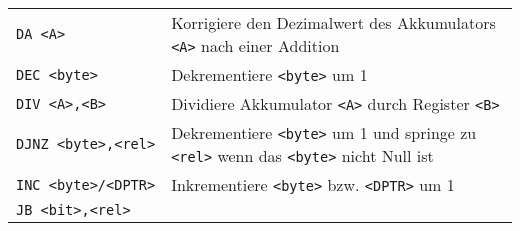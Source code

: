 \begin{longtable}[c]{@{}ll@{}}
\begin{minipage}[t]{0.25\columnwidth}\raggedright\strut
\texttt{DA\ \textless{}A\textgreater{}}
\strut\end{minipage} &
\begin{minipage}[t]{0.69\columnwidth}\raggedright\strut
Korrigiere den Dezimalwert des Akkumulators
\texttt{\textless{}A\textgreater{}} nach einer Addition
\strut\end{minipage}\tabularnewline
\begin{minipage}[t]{0.25\columnwidth}\raggedright\strut
\texttt{DEC\ \textless{}byte\textgreater{}}
\strut\end{minipage} &
\begin{minipage}[t]{0.69\columnwidth}\raggedright\strut
Dekrementiere \texttt{\textless{}byte\textgreater{}} um 1
\strut\end{minipage}\tabularnewline
\begin{minipage}[t]{0.25\columnwidth}\raggedright\strut
\texttt{DIV\ \textless{}A\textgreater{},\textless{}B\textgreater{}}
\strut\end{minipage} &
\begin{minipage}[t]{0.69\columnwidth}\raggedright\strut
Dividiere Akkumulator \texttt{\textless{}A\textgreater{}} durch Register
\texttt{\textless{}B\textgreater{}}
\strut\end{minipage}\tabularnewline
\begin{minipage}[t]{0.25\columnwidth}\raggedright\strut
\texttt{DJNZ\ \textless{}byte\textgreater{},\textless{}rel\textgreater{}}
\strut\end{minipage} &
\begin{minipage}[t]{0.69\columnwidth}\raggedright\strut
Dekrementiere \texttt{\textless{}byte\textgreater{}} um 1 und springe zu
\texttt{\textless{}rel\textgreater{}} wenn das
\texttt{\textless{}byte\textgreater{}} nicht Null ist
\strut\end{minipage}\tabularnewline
\begin{minipage}[t]{0.25\columnwidth}\raggedright\strut
\texttt{INC\ \textless{}byte\textgreater{}/\textless{}DPTR\textgreater{}}
\strut\end{minipage} &
\begin{minipage}[t]{0.69\columnwidth}\raggedright\strut
Inkrementiere \texttt{\textless{}byte\textgreater{}} bzw.
\texttt{\textless{}DPTR\textgreater{}} um 1
\strut\end{minipage}\tabularnewline
\begin{minipage}[t]{0.25\columnwidth}\raggedright\strut
\texttt{JB\ \textless{}bit\textgreater{},\textless{}rel\textgreater{}}

\end{minipage}
\end{longtable}
